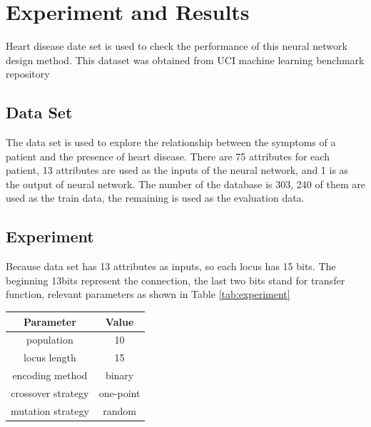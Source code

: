 \documentclass[smallextended]{svjour3}       %
\begin{document}
\begin{multicols}{2}
\begin{center}
\label{plot:offspring}
\end{center}



\section{Experiment and Results}
Heart disease date set is used to check the performance of this neural network
design method. This dataset was obtained from UCI machine learning benchmark
repository
\subsection{Data Set}
  The data set is used to explore the relationship between the symptoms of a
patient and the presence of heart disease. There are 75 attributes for each
patient, 13 attributes are used as the inputs of the neural network, and 1 is as
the output of neural network. The number of the database is 303, 240 of them are
used as the train data, the remaining is used as the evaluation data.

\subsection{Experiment}
Because data set has 13 attributes as inputs, so each locus has 15 bits. The
beginning 13bits represent the connection, the last two bits stand for transfer
function, relevant parameters as shown in Table \ref{tab:experiment}  

\begin{center}
\begin{tabular}{cc}
	\toprule
	Parameter &  Value \\
	\midrule
	population  & 10         \\ 
	locus length& 15 	      \\
	encoding method & binary          \\
	crossover strategy & one-point \\
	mutation strategy& random\\
	\bottomrule
\end{tabular}
\label{tab:experiment}
\end{center}



\end{multicols}
\end{document}
